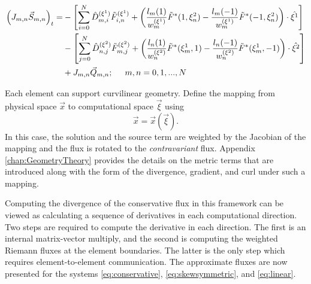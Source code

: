 \documentclass{softwaremanual}
\begin{document}
 \begin{equation}
 \begin{split}
 \left( J_{m,n} \vec{S}_{m,n} \right)_t =  &-\left[\sum_{i=0}^{N}\hat{D}^{(\xi^1)}_{m,i} \tilde{F}^{(\xi^1)}_{i,n}   + \left( \frac{ l_m(1)}{w^{(\xi^1)}_m} \tilde{F}^{*}(1,\xi^2_n) - \frac{ l_m(-1)}{w^{(\xi^1)}_m} \tilde{F}^{*}(-1,\xi^2_n) \right) \cdot \hat{\xi^1} \right] \\
  &-\left[ \sum_{j=0}^{N}\hat{D}^{(\xi^2)}_{n,j} \tilde{F}^{(\xi^2)}_{m,j}  + \left( \frac{l_n(1)}{w^{(\xi^2)}_n} \tilde{F}^{*}(\xi^1_m,1)  -  \frac{l_n(-1)}{w^{(\xi^2)}_n} \tilde{F}^{*}(\xi^1_m,-1) \right)\cdot \hat{\xi^2}  \right] \\ 
 &+ J_{m,n}\vec{Q}_{m,n}; \hspace{5mm} m,n=0,1,...,N
\end{split} \label{eq:discrete2d_system} 
 \end{equation}

Each element can support curvilinear geometry. Define the mapping from physical space $\vec{x}$ to computational space $\vec{\xi}$ using
  \begin{equation}
  \vec{x} = \vec{x}(\vec{\xi}).\label{eq:mapping}
  \end{equation}
In this case, the solution and the source term are weighted by the Jacobian of the mapping and the flux is rotated to the \textit{contravariant} flux. Appendix \ref{chap:GeometryTheory} provides the details on the metric terms that are introduced along with the form of the divergence, gradient, and curl under such a mapping.

 Computing the divergence of the conservative flux in this framework can be viewed as calculating a sequence of derivatives in each computational direction. Two steps are required to compute the derivative in each direction. The first is an internal matrix-vector multiply, and the second is computing the weighted Riemann fluxes at the element boundaries. The latter is the only step which requires element-to-element communication. The approximate fluxes are now presented for the systems \eqref{eq:conservative}, \eqref{eq:skewsymmetric}, and \eqref{eq:linear}.
\end{document}
